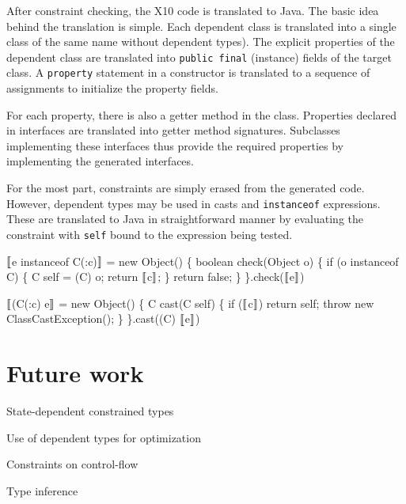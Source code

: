 \documentclass[nocopyrightspace,preprint,9pt]{sigplanconf}
\begin{document}
After constraint checking, the X10 code is translated to Java.
The basic idea behind the translation is simple. Each dependent class
is translated into a single class of the same name without dependent
types). The explicit properties of the dependent class are translated
into {\tt public final} (instance) fields of the target class.
A {\tt property} statement in a constructor is translated to a
sequence of assignments to initialize the property fields.

For each property, there is also a getter method in the class.
Properties declared in interfaces are translated into getter
method signatures.  Subclasses implementing these interfaces
thus provide the required properties by implementing the
generated interfaces.

For the most part, constraints are simply erased from the
generated code.
However, dependent types may be used in casts
and {\tt instanceof} expressions.  These are translated to Java
in straightforward manner by evaluating the constraint with
{\tt self} bound to the expression being tested.

\begin{code}
  $\Lb$e instanceof C(:c)$\Rb$ = 
    new Object() \{
      boolean check(Object o) \{
        if (o instanceof C) \{
          C self = (C) o;
          return $\Lb$c$\Rb$;
        \}
        return false;
      \}
    \}.check($\Lb$e$\Rb$)
\end{code}

\begin{code}
  $\Lb$(C(:c) e$\Rb$ = 
    new Object() \{
      C cast(C self) \{
        if ($\Lb$c$\Rb$)
          return self;
        throw new ClassCastException();
      \}
    \}.cast((C) $\Lb$e$\Rb$)
\end{code}




\section{Future work}
\label{sec:future}

%
%
%
%

State-dependent constrained types

Use of dependent types for optimization

Constraints on control-flow

Type inference
\end{document}

